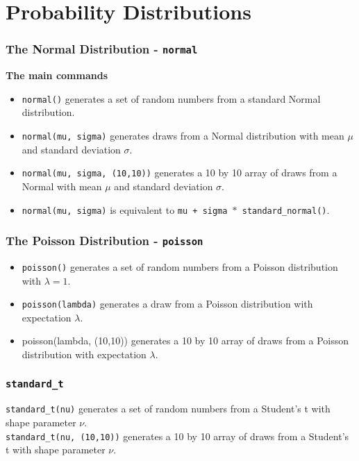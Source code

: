 \documentclass[MASTER.tex]{subfiles}
\begin{document}
 
	

\section{Probability Distributions}

\begin{frame}
	\frametitle{The Normal Distribution  - \texttt{normal}}
	\large
	\textbf{The main commands}
	\begin{itemize}
	\item \texttt{normal()} generates a set of random numbers from a standard Normal distribution.\item \texttt{normal(mu, sigma)} generates draws from
	a Normal distribution with mean $\mu$ and standard deviation $\sigma$. \item \texttt{normal(mu, sigma, (10,10))} generates a 10 by 10 array
	of draws from a Normal with mean $\mu$ and standard deviation $\sigma$. 
	\item 
	\texttt{normal(mu, sigma)} is equivalent to \texttt{mu + sigma $\ast$ \texttt{standard\_normal()}}.
	\end{itemize}
\end{frame}
\begin{frame}
	\frametitle{The Poisson Distribution - \texttt{poisson}}
	\begin{itemize}
	\item \texttt{poisson()} generates a set of random numbers from a Poisson distribution with $\lambda = 1$.\item  \texttt{poisson(lambda)} generates a draw
		from a Poisson distribution with expectation $\lambda$. 
		\item poisson(lambda, (10,10)) generates a 10 by 10 array of
		draws from a Poisson distribution with expectation $\lambda$.
		
	\end{itemize}

\end{frame}
\begin{frame}
	\frametitle{\texttt{standard\_t}}
	\texttt{standard\_t(nu)} generates a set of random numbers from a Student’s t with shape parameter $\nu$.\\ \texttt{standard\_t(nu, (10,10))}
	generates a 10 by 10 array of draws from a Student’s t with shape parameter $\nu$.
\end{frame}
\end{document}
